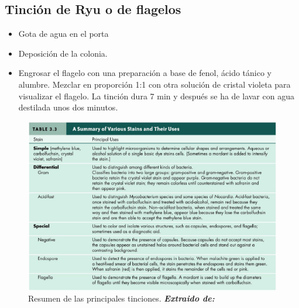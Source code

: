 \subsection{Tinción de Ryu o de flagelos}
\begin{itemize}[itemsep=0pt,parsep=0pt,topsep=0pt,partopsep=0pt]
	\item Gota de agua en el porta
	\item Deposición de la colonia.
	\item Engrosar el flagelo con una preparación a base de fenol, ácido tánico y alumbre. Mezclar en proporción 1:1 con otra solución de cristal violeta para visualizar el flagelo. La tinción dura 7 min y después se ha de lavar con agua destilada unos dos minutos.
\end{itemize}
\begin{figure}[H]
	\centering
	\includegraphics[width=\columnwidth]{A.imagenes/ACV-MICRO-Temp1}
	\caption[Resumen de las principales tinciones.]{Resumen de las principales tinciones. \textit{\textbf{Extraido de:}} \cite{Prescott2011}}
\end{figure}